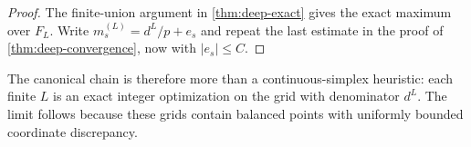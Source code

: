 \begin{proof}
The finite-union argument in \cref{thm:deep-exact} gives the exact maximum
over $F_L$.  Write $m_s^{(L)}=d^L/p+e_s$ and repeat the last estimate in the
proof of \cref{thm:deep-convergence}, now with $|e_s|\leq C$.
\end{proof}

The canonical chain is therefore more than a continuous-simplex heuristic:
each finite $L$ is an exact integer optimization on the grid with denominator
$d^L$.  The limit follows because these grids contain balanced points with
uniformly bounded coordinate discrepancy.
